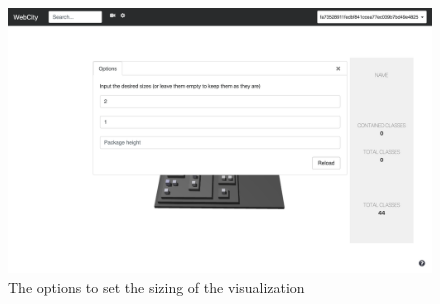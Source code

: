 \documentclass[]{usiinfbachelorproject}
\begin{document}
\begin{figure} [H]
\centering
\includegraphics[width=1\textwidth]{pictures/sizing_card.png}
\caption{The options to set the sizing of the visualization}
\label{fig:sizing}
\end{figure}
\end{document}
